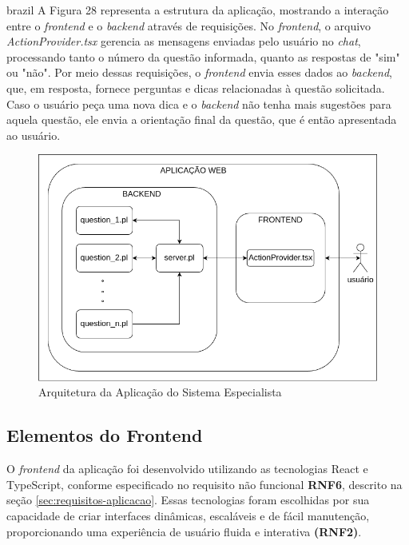 \begin{otherlanguage*}{brazil}
A Figura 28 representa a estrutura da aplicação, mostrando a interação entre o \textit{frontend} e o \textit{backend} através de requisições. No \textit{frontend}, o arquivo \textit{ActionProvider.tsx} gerencia as mensagens enviadas pelo usuário no \textit{chat}, processando tanto o número da questão informada, quanto as respostas de "sim" ou "não". Por meio dessas requisições, o \textit{frontend} envia esses dados ao \textit{backend}, que, em resposta, fornece perguntas e dicas relacionadas à questão solicitada. Caso o usuário peça uma nova dica e o \textit{backend} não tenha mais sugestões para aquela questão, ele envia a orientação final da questão, que é então apresentada ao usuário.

\begin{figure}[h!]
    \centering
            \caption{Arquitetura da Aplicação do Sistema Especialista}
            \label{fig:ModeloConceitual}
        \includegraphics[scale=0.6]{pictures/arquitetura.png}
\end{figure}

\subsection{Elementos do Frontend}

O \textit{frontend} da aplicação foi desenvolvido utilizando as tecnologias React e TypeScript, conforme especificado no requisito não funcional \textbf{RNF6}, descrito na seção \ref{sec:requisitos-aplicacao}. Essas tecnologias foram escolhidas por sua capacidade de criar interfaces dinâmicas, escaláveis e de fácil manutenção, proporcionando uma experiência de usuário fluida e interativa \textbf{(RNF2)}.


\end{otherlanguage*}
